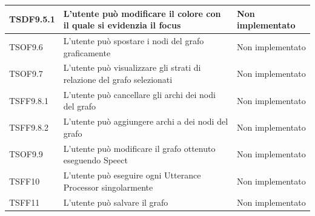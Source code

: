 \documentclass[openany,12pt,a4paper]{report}
\begin{document}
\begin{longtable}{| p{2cm} |p{5cm} | p{2.5cm} |}
	\newline TSDF9.5.1&
	\newline L'utente può modificare il colore con il quale si evidenzia il focus&
	\newline Non implementato
	\\[1em]
	\hline
	
	\newline TSOF9.6&
	\newline L'utente può spostare i nodi del grafo graficamente&
	\newline Non implementato
	\\[1em]
	\hline
	
	\newline TSOF9.7&
	\newline L'utente può visualizzare gli strati di relazione del grafo selezionati&
	\newline Non implementato
	\\[1em]
	\hline
	
	\newline TSFF9.8.1&
	\newline L'utente può cancellare gli archi dei nodi del grafo&
	\newline Non implementato
	\\[1em]
	\hline
	
	\newline TSFF9.8.2&
	\newline L'utente può aggiungere archi a dei nodi del grafo&
	\newline Non implementato
	\\[1em]
	\hline
	
	\newline TSOF9.9&
	\newline L'utente può modificare il grafo ottenuto eseguendo Speect&
	\newline Non implementato
	\\[1em]
	\hline	
	
	\newline TSFF10&
	\newline L'utente può eseguire ogni Utterance Processor singolarmente&
	\newline Non implementato
	\\[1em]
	\hline
	
	
	\newline TSFF11&
	\newline L'utente può salvare il grafo&
	\newline Non implementato
	\\[1em]
	\hline
	

\end{longtable}
\end{document}
